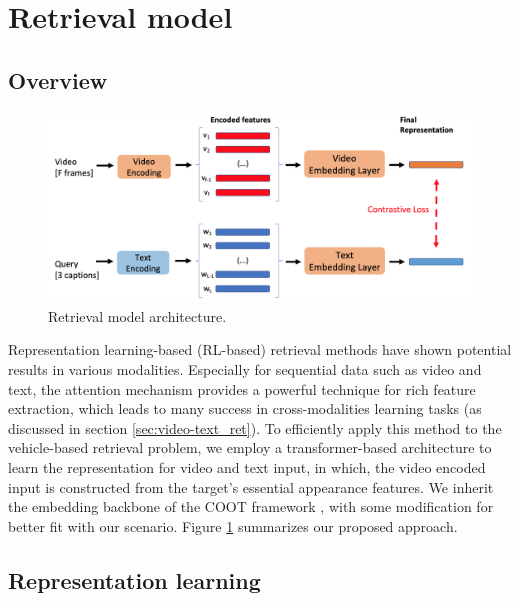\section{Retrieval model}
\label{sec:retrieval_model}
\subsection{Overview}
\begin{figure}[!htb]
    \centering
    \includegraphics[width=\linewidth]{images/methods/retrieval_model.png}
    \caption{Retrieval model architecture.}
    \label{fig:ret_overview}
\end{figure}
Representation learning-based (RL-based) retrieval methods have shown potential results in various modalities. 
Especially for sequential data such as video and text, the attention mechanism provides a powerful technique for rich feature extraction, which leads to many success in cross-modalities learning tasks (as discussed in section \ref{sec:video-text_ret}). 
To efficiently apply this method to the vehicle-based retrieval problem, we employ a transformer-based architecture to learn the representation for video and text input, in which, the video encoded input is constructed from the target's essential appearance features. 
We inherit the embedding backbone of the COOT framework \cite{ging2020coot}, with some modification for better fit with our scenario.
Figure \ref{fig:ret_overview} summarizes our proposed approach.

\subsection{Representation learning}

